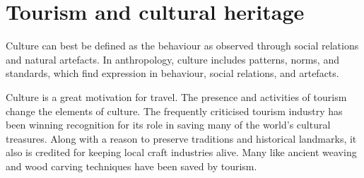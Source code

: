 
\section{Tourism and cultural heritage} %
\label{sec:tch}

Culture can best be defined as the behaviour as observed through social relations and natural artefacts. In anthropology, culture includes patterns, norms, and standards, which find expression in behaviour, social relations, and artefacts.

Culture is a great motivation for travel. The presence and activities of tourism change the elements of culture. The frequently criticised tourism industry has been winning recognition for its role in saving many of the world's cultural treasures. Along with a reason to preserve traditions and historical landmarks, it also is credited for keeping local craft industries alive. Many like ancient weaving and wood carving techniques have been saved by tourism.


